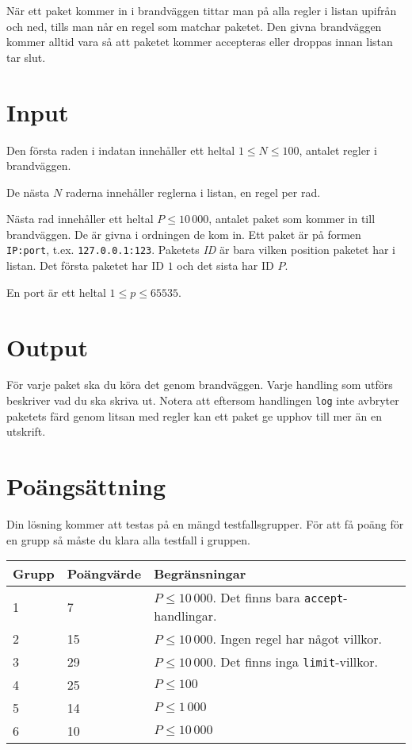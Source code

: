 När ett paket kommer in i brandväggen tittar man på alla regler i listan upifrån och ned, tills man når en regel som matchar paketet. Den givna brandväggen kommer alltid vara
så att paketet kommer accepteras eller droppas innan listan tar slut.

\section*{Input}
Den första raden i indatan innehåller ett heltal $1 \le N \le 100$, antalet regler i brandväggen.

De nästa $N$ raderna innehåller reglerna i listan, en regel per rad.

Nästa rad innehåller ett heltal $P \le 10\,000$, antalet paket som kommer in till brandväggen. De är givna i ordningen de kom in.
Ett paket är på formen \texttt{IP:port}, t.ex. \texttt{127.0.0.1:123}. Paketets \emph{ID} är bara vilken position paketet har i listan. Det första paketet har ID $1$ och det sista har ID $P$.

En port är ett heltal $1 \le p \le 65535$.

\section*{Output}
För varje paket ska du köra det genom brandväggen. Varje handling som utförs beskriver vad du ska skriva ut. Notera att eftersom handlingen \texttt{log} inte avbryter
paketets färd genom litsan med regler kan ett paket ge upphov till mer än en utskrift.

\section*{Poängsättning}
Din lösning kommer att testas på en mängd testfallsgrupper. För att få poäng för en grupp så måste du klara alla testfall i gruppen.

\begin{tabular}{| l | l | l |}
	\hline
	Grupp & Poängvärde & Begränsningar\\ \hline
	1     & 7          & $P \le 10\,000$. Det finns bara \texttt{accept}-handlingar.  \\ \hline
	2     & 15         & $P \le 10\,000$. Ingen regel har något villkor. \\ \hline
	3     & 29         & $P \le 10\,000$. Det finns inga \texttt{limit}-villkor. \\ \hline
	4     & 25         & $P \le 100$ \\ \hline
	5     & 14         & $P \le 1\,000$ \\ \hline
	6     & 10         & $P \le 10\,000$ \\ \hline
\end{tabular}
